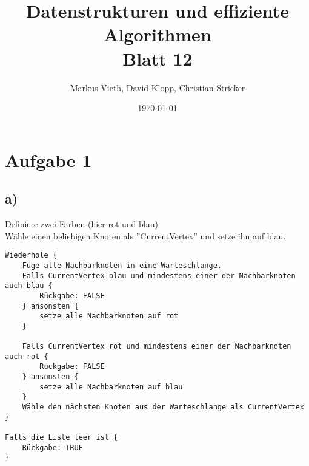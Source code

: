 \documentclass[a4paper,11pt,twoside]{scrartcl}
\title{Datenstrukturen und effiziente Algorithmen\\ Blatt 12}
\author{Markus Vieth, David Klopp, Christian Stricker}
\date{\today}
\begin{document}
\maketitle
\cleardoublepage
\pagestyle{myheadings}

\section*{Aufgabe 1}
\subsection*{a)} 
Definiere zwei Farben (hier rot und blau)\\
Wähle einen beliebigen Knoten als ''CurrentVertex'' und setze ihn auf blau.\\

\begin{lstlisting}
Wiederhole {
	Füge alle Nachbarknoten in eine Warteschlange.
	Falls CurrentVertex blau und mindestens einer der Nachbarknoten auch blau {
		Rückgabe: FALSE
	} ansonsten {
		setze alle Nachbarknoten auf rot
	}
	
	Falls CurrentVertex rot und mindestens einer der Nachbarknoten auch rot {
		Rückgabe: FALSE
	} ansonsten {
		setze alle Nachbarknoten auf blau
	}
	Wähle den nächsten Knoten aus der Warteschlange als CurrentVertex
}

Falls die Liste leer ist {
	Rückgabe: TRUE
}
\end{lstlisting}
\end{document}
